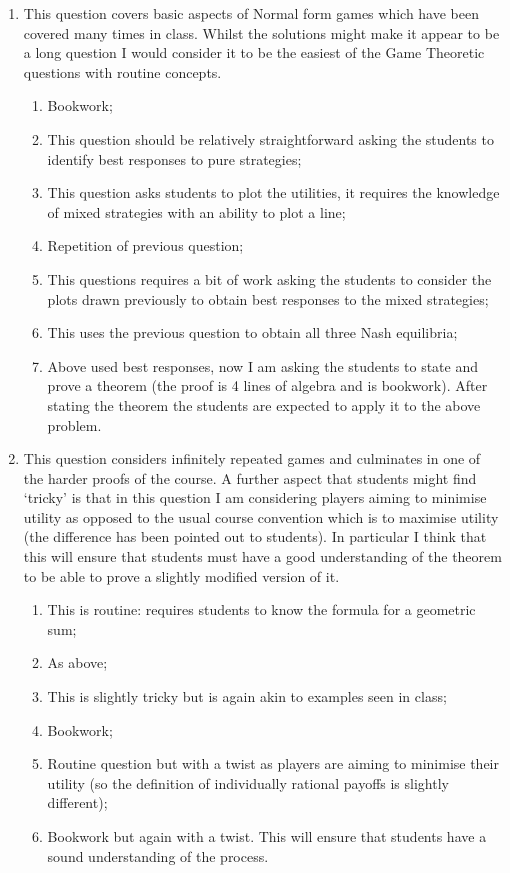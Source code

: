 \documentclass[12pt,a4paper]{article}
\begin{document}
\null \vskip1cm
\begin{enumerate}

\item This question covers basic aspects of Normal form games which have been covered many times in class. Whilst the solutions might make it appear to be a long question I would consider it to be the easiest of the Game Theoretic questions with routine concepts.

    \begin{enumerate}
        \item Bookwork;
        \item This question should be relatively straightforward asking the students to identify best responses to pure strategies;
        \item This question asks students to plot the utilities, it requires the knowledge of mixed strategies with an ability to plot a line;
        \item Repetition of previous question;
        \item This questions requires a bit of work asking the students to consider the plots drawn previously to obtain best responses to the mixed strategies;
        \item This uses the previous question to obtain all three Nash equilibria;
        \item Above used best responses, now I am asking the students to state and prove a theorem (the proof is 4 lines of algebra and is bookwork). After stating the theorem the students are expected to apply it to the above problem.
    \end{enumerate}

\item This question considers infinitely repeated games and culminates in one of the harder proofs of the course. A further aspect that students might find `tricky' is that in this question I am considering players aiming to minimise utility as opposed to the usual course convention which is to maximise utility (the difference has been pointed out to students). In particular I think that this will ensure that students must have a good understanding of the theorem to be able to prove a slightly modified version of it.

    \begin{enumerate}
        \item This is routine: requires students to know the formula for a geometric sum;
        \item As above;
        \item This is slightly tricky but is again akin to examples seen in class;
        \item Bookwork;
        \item Routine question but with a twist as players are aiming to minimise their utility (so the definition of individually rational payoffs is slightly different);
        \item Bookwork but again with a twist. This will ensure that students have a sound understanding of the process.
    \end{enumerate}



\end{enumerate}
\end{document}

